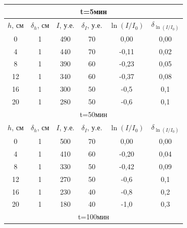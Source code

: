 \documentclass[a4paper, 12pt]{article}%
\begin{document}
\begin{table}[h]
\begin{center}

\begin{tabular}{|c|c|c|c|c|c|}
\hline
\multicolumn{6}{|c|}{t=5мин}                                                                   \\ \hline
$h$, см & $\delta_h$, см & $I$, у.е. & $\delta_I$, у.е. & $\ln(I/I_0)$ & $\delta_{\ln(I/I_0)}$ \\ \hline
0       & 1              & 490       & 70               & 0,00         & 0,00                  \\ \hline
4       & 1              & 440       & 70               & -0,11        & 0,02                  \\ \hline
8       & 1              & 390       & 60               & -0,23        & 0,05                  \\ \hline
12      & 1              & 340       & 60               & -0,37        & 0,08                  \\ \hline
16      & 1              & 300       & 50               & -0,5         & 0,1                   \\ \hline
20      & 1              & 280       & 50               & -0,6         & 0,1                   \\ \hline
\multicolumn{6}{|c|}{t=50мин}                                                                  \\ \hline
$h$, см & $\delta_h$, см & $I$, у.е. & $\delta_I$, у.е. & $\ln(I/I_0)$ & $\delta_{\ln(I/I_0)}$ \\ \hline
0       & 1              & 500       & 70               & 0,00         & 0,00                  \\ \hline
4       & 1              & 410       & 60               & -0,20        & 0,04                  \\ \hline
8       & 1              & 330       & 50               & -0,42        & 0,09                  \\ \hline
12      & 1              & 270       & 50               & -0,6         & 0,1                   \\ \hline
16      & 1              & 230       & 40               & -0,8         & 0,2                   \\ \hline
20      & 1              & 180       & 40               & -1,0         & 0,3                   \\ \hline
\multicolumn{6}{|c|}{t=100мин}                                                                 \\ \hline

\end{tabular}
\end{center}
\end{table}
\end{document}
